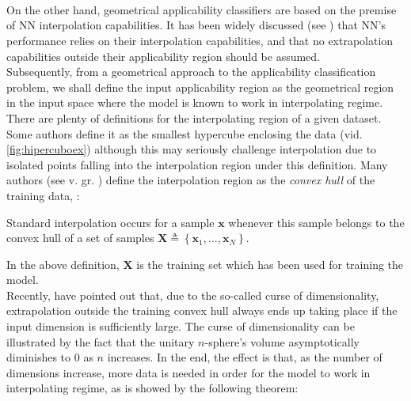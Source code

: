 \paragraph{ \\}
On the other hand, geometrical applicability classifiers are based on the premise of NN interpolation capabilities. It has been widely discussed (see \eg \cite{pmlr-v80-barrett18a,DBLP:journals/corr/abs-1711-00350,DBLP:journals/corr/abs-1904-01557}) that NN's performance relies on their interpolation capabilities, and that no extrapolation capabilities outside their applicability region should be assumed.\\
%
\indent Subsequently, from a geometrical approach to the applicability classification problem, we shall define the input applicability region as the geometrical region in the input space where the model is known to work in interpolating regime.\\
%
\indent There are plenty of definitions for the interpolating region of a given dataset. Some authors define it as the smallest hypercube enclosing the data\cite{ebert2014interpolation} (vid. \autoref{fig:hipercuboex}) although this may seriously challenge interpolation due to isolated points falling into the interpolation region under this definition. Many authors (see v. gr. \cite{loh2007extrapolation,4505337}) define the interpolation region as the \textit{convex hull} of the training data, \ie:

\begin{definition}\cite{balestriero2021learning}\label{def:interpolacion}
	Standard interpolation occurs for a sample $\mathbf{x}$ whenever this sample belongs to the convex hull of a set of samples $\mathbf{X}\triangleq \left\{\mathbf{x}_1,...,\mathbf{x}_N\right\}$.
\end{definition}

In the above definition, $\mathbf{X}$ is the training set which has been used for training the model.\\
%
\indent Recently, \cite{balestriero2021learning} have pointed out that, due to the so-called curse of dimensionality, extrapolation outside the training convex hull always ends up taking place if the input dimension is sufficiently large. The curse of dimensionality\cite[pp. 17-18]{Marsland2015Machine} can be illustrated by the fact that the unitary $n$-sphere's volume asymptotically diminishes to $0$ as $n$ increases. In the end, the effect is that, as the number of dimensions increase, more data is needed in order for the model to work in interpolating regime, as is showed by the following theorem:\\

